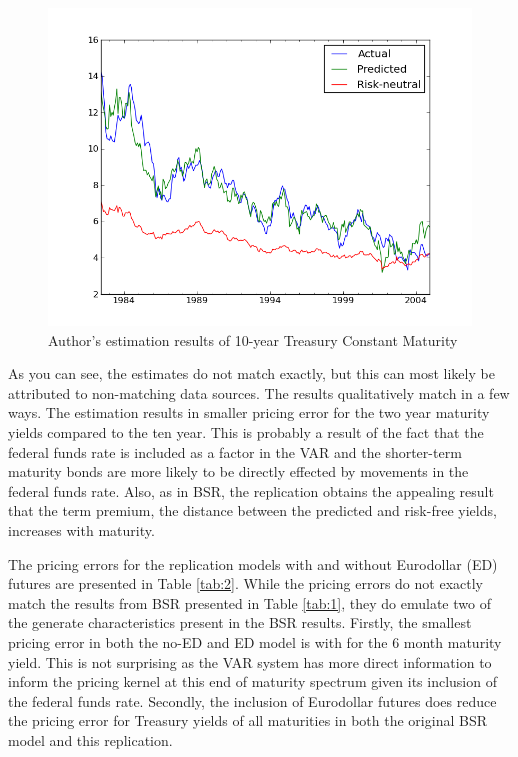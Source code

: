 \documentclass{article}
\numberwithin{equation}{section}
\begin{document}
\begin{figure}[htp]
  \begin{center}
    \includegraphics[scale=0.6]{./figures/tenyr_rep.png}
  \end{center}
  \caption{Author's estimation results of 10-year Treasury Constant Maturity}
  \label{fig:repl1}
\end{figure}

As you can see, the estimates do not match exactly, but this can most likely be
attributed to non-matching data sources. The results qualitatively match in
a few ways. The estimation results in smaller pricing error for the two year
maturity yields compared to the ten year. This is probably a result of the fact
that the federal funds rate is included as a factor in the VAR and the
shorter-term maturity bonds are more likely to be directly effected by
movements in the federal funds rate. Also, as in BSR, the replication obtains
the appealing result that the term premium, the distance between the predicted
and risk-free yields, increases with maturity.

The pricing errors for the replication models with and without Eurodollar (ED)
futures are presented in Table \ref{tab:2}. While the pricing errors do not
exactly match the results from BSR presented in Table \ref{tab:1}, they do
emulate two of the generate characteristics present in the BSR results.
Firstly, the smallest pricing error in both the no-ED and ED model is with for
the 6 month maturity yield. This is not surprising as the VAR system has more
direct information to inform the pricing kernel at this end of maturity
spectrum given its inclusion of the federal funds rate. Secondly, the inclusion
of Eurodollar futures does reduce the pricing error for Treasury yields of all
maturities in both the original BSR model and this replication.
\end{document}
